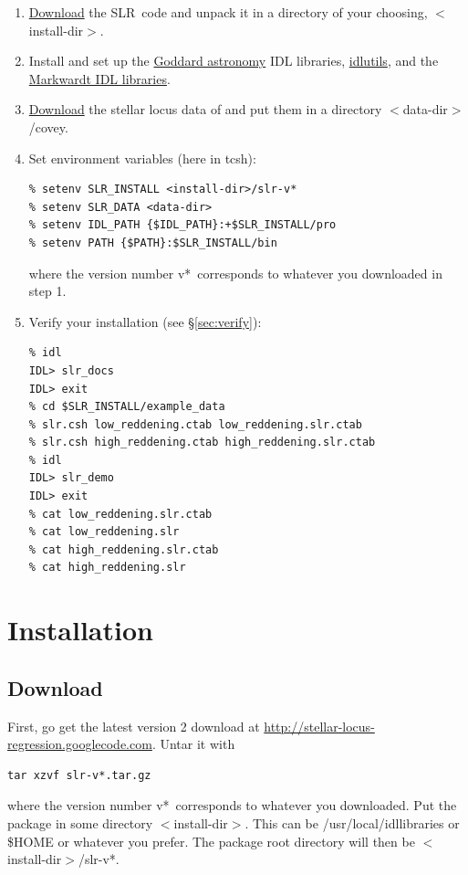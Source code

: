 \documentclass{report}
\newcommand{\slr}{SLR}
\begin{document}
\begin{enumerate}
\item \href{http://stellar-locus-regression.googlecode.com}{Download}
  the \slr\ code and unpack it in a directory of your choosing,
  $<$install-dir$>$.
\item Install and set up the \href{http://idlastro.gsfc.nasa.gov}{Goddard
    astronomy} IDL libraries,
  \href{http://www.astro.princeton.edu/~schlegel/code.html}{idlutils},
  and the \href{http://www.physics.wisc.edu/~craigm/idl}{Markwardt IDL
    libraries}.
\item
  \href{http://www.cfa.harvard.edu/~kcovey/research/medianlocus.tbl}{Download}
  the stellar locus data of \citet{bib:covey} and put them in a
  directory $<$data-dir$>$/covey.
\item Set environment variables (here in tcsh):
\begin{verbatim}
% setenv SLR_INSTALL <install-dir>/slr-v*
% setenv SLR_DATA <data-dir>
% setenv IDL_PATH {$IDL_PATH}:+$SLR_INSTALL/pro
% setenv PATH {$PATH}:$SLR_INSTALL/bin
\end{verbatim}
  where the version number v*\ corresponds to whatever you
  downloaded in step 1.
\item Verify your installation (see \S\ref{sec:verify}):
\begin{verbatim}
% idl
IDL> slr_docs
IDL> exit
% cd $SLR_INSTALL/example_data
% slr.csh low_reddening.ctab low_reddening.slr.ctab
% slr.csh high_reddening.ctab high_reddening.slr.ctab
% idl
IDL> slr_demo
IDL> exit
% cat low_reddening.slr.ctab
% cat low_reddening.slr
% cat high_reddening.slr.ctab
% cat high_reddening.slr
\end{verbatim}
\end{enumerate}


\chapter{Installation}

\section{Download}

First, go get the latest version 2 download at
\url{http://stellar-locus-regression.googlecode.com}. Untar
it with
\begin{verbatim}
tar xzvf slr-v*.tar.gz
\end{verbatim}
where the version number v*\ corresponds to whatever you downloaded.
Put the package in some directory $<$install-dir$>$. This can be
/usr/local/idllibraries or \$HOME or whatever you prefer. The package
root directory will then be $<$install-dir$>$/slr-v*.
\end{document}
